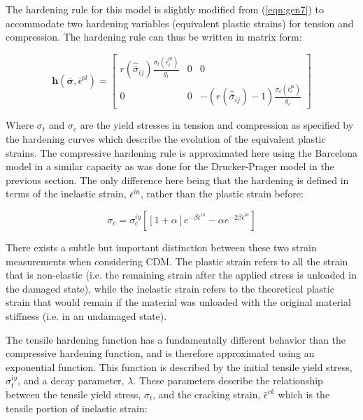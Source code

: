 The hardening rule for this model is slightly modified from (\ref{eqn:gen7}) to accommodate two hardening variables (equivalent plastic strains) for tension and compression. The hardening rule can thus be written in matrix form:

\begin{equation}
\mathbf{h}\left(\bar{\boldsymbol{\sigma}},\bar{\epsilon}^{pl}\right)=\left[\begin{array}{ccc}
r\left(\hat{\bar{\sigma}}_{ij}\right)\frac{\sigma_t\left(\bar{\epsilon}_{t}^{pl}\right)}{g_t} & 0 & 0\\
0 & 0 & -\left(r\left(\hat{\bar{\sigma}}_{ij}\right)-1\right)\frac{\sigma_c\left(\bar{\epsilon}_{c}^{pl}\right)}{g_c}
\end{array}\right]\label{eqn:const9-1}
\end{equation}

Where $\sigma_t$ and $\sigma_c$ are the yield stresses in tension and compression as specified by the hardening curves which describe the evolution of the equivalent plastic strains. The compressive hardening rule is approximated here using the Barcelona model in a similar capacity as was done for the Drucker-Prager model in the previous section. The only difference here being that the hardening is defined in terms of the inelastic strain, $\bar{\epsilon}^{in}$, rather than the plastic strain before: 

\begin{equation}
\sigma_c=\sigma_c^{iy}\left [ \left [1+\alpha \right ] e^{-\beta\bar{\epsilon}^{in}}-\alpha e^{-2\beta\bar{\epsilon}^{in}}  \right ]
\label{eqn:dam1b}
\end{equation}

There exists a subtle but important distinction between these two strain measurements when considering CDM. The plastic strain refers to all the strain that is non-elastic (i.e. the remaining strain after the applied stress is unloaded in the damaged state), while the inelastic strain refers to the theoretical plastic strain that would remain if the material was unloaded with the original material stiffness (i.e. in an undamaged state).

The tensile hardening function has a fundamentally different behavior than the compressive hardening function, and is therefore approximated using an exponential function. This function is described by the initial tensile yield stress, $\sigma_{t}^{iy}$, and a decay parameter, $\lambda$. These parameters describe the relationship between the tensile yield stress, $\sigma_{t}$, and the cracking strain, $\bar{\epsilon}^{ck}$ which is the tensile portion of inelastic strain:

